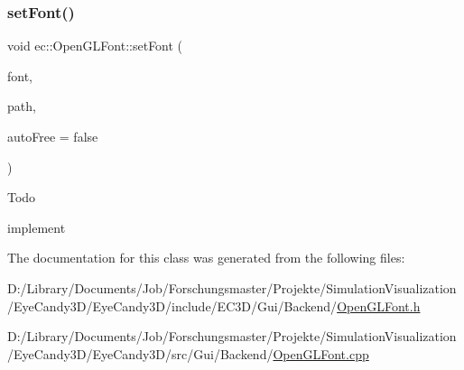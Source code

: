 \subsubsection{\texorpdfstring{set\+Font()}{setFont()}}
{\footnotesize\ttfamily void ec\+::\+Open\+G\+L\+Font\+::set\+Font (\begin{DoxyParamCaption}\item[{\mbox{\hyperlink{classec_1_1_font_texture_atlas}{ec\+::\+Font\+Texture\+Atlas}} $\ast$}]{font,  }\item[{const std\+::string \&}]{path,  }\item[{bool}]{auto\+Free = {\ttfamily false} }\end{DoxyParamCaption})\hspace{0.3cm}{\ttfamily [virtual]}}

\begin{DoxyRefDesc}{Todo}
\item[\mbox{\hyperlink{todo__todo000014}{Todo}}]implement \end{DoxyRefDesc}


The documentation for this class was generated from the following files\+:\begin{DoxyCompactItemize}
\item 
D\+:/\+Library/\+Documents/\+Job/\+Forschungsmaster/\+Projekte/\+Simulation\+Visualization/\+Eye\+Candy3\+D/\+Eye\+Candy3\+D/include/\+E\+C3\+D/\+Gui/\+Backend/\mbox{\hyperlink{_open_g_l_font_8h}{Open\+G\+L\+Font.\+h}}\item 
D\+:/\+Library/\+Documents/\+Job/\+Forschungsmaster/\+Projekte/\+Simulation\+Visualization/\+Eye\+Candy3\+D/\+Eye\+Candy3\+D/src/\+Gui/\+Backend/\mbox{\hyperlink{_open_g_l_font_8cpp}{Open\+G\+L\+Font.\+cpp}}\end{DoxyCompactItemize}

